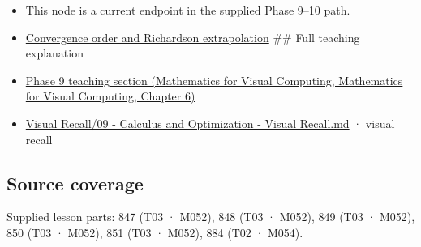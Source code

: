 \begin{itemize}
\item
  This node is a current endpoint in the supplied Phase 9--10 path.
\item
  \hyperref[appendix-aca80b6bf17a]{Convergence order and Richardson extrapolation} \#\# Full teaching explanation
\item
  \href{../02-Mathematics-for-Visual-Computing/main.pdf\#nameddest=02-foundations-ii-ch022-numerical-differentiation-and-automatic-differentiation}{Phase 9 teaching section (Mathematics for Visual Computing, Mathematics for Visual Computing, Chapter 6)}
\item
  \hyperref[appendix-adf48f5dc5c1]{Visual Recall/09 - Calculus and Optimization - Visual Recall.md} · visual recall
\end{itemize}

\subsection{Source coverage}\label{appendix-e2d7b4f2161d-source-coverage}

Supplied lesson parts: 847 (T03 · M052), 848 (T03 · M052), 849 (T03 · M052), 850 (T03 · M052), 851 (T03 · M052), 884 (T02 · M054).
